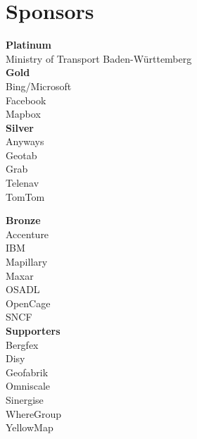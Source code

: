 \section*{Sponsors}
\label{sponsors}
\RaggedRight
\begin{multicols}{2}
  \begin{small}
    \textbf{Platinum}\\
    Ministry of Transport Baden-Württemberg\\

    \vspace{\volunteerSpace}
    \textbf{Gold}\\
    Bing/Microsoft\\
    Facebook\\
    Mapbox\\

    \vspace{\volunteerSpace}
    \textbf{Silver}\\
    Anyways\\
    Geotab\\
    Grab\\
    Telenav\\
    TomTom\\
    \columnbreak

    \vspace{\volunteerSpace}
    \textbf{Bronze}\\
    Accenture\\
    IBM\\
    Mapillary\\
    Maxar\\
    OSADL\\
    OpenCage\\
    SNCF\\

    \vspace{\volunteerSpace}
    \textbf{Supporters}\\
    Bergfex\\
    Disy\\
    Geofabrik\\
    Omniscale\\
    Sinergise\\
    WhereGroup\\
    YellowMap\\

  \end{small}
\end{multicols}

\justifying
